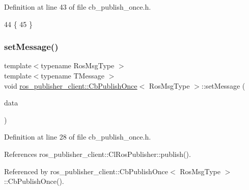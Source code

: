 Definition at line 43 of file cb\+\_\+publish\+\_\+once.\+h.


\begin{DoxyCode}
44     \{
45     \}
\end{DoxyCode}
\mbox{\label{classros__publisher__client_1_1CbPublishOnce_a06bef500e116390ee85a790401e600d8}} 
\subsubsection{\texorpdfstring{set\+Message()}{setMessage()}}
{\footnotesize\ttfamily template$<$typename Ros\+Msg\+Type $>$ \\
template$<$typename T\+Message $>$ \\
void \hyperlink{classros__publisher__client_1_1CbPublishOnce}{ros\+\_\+publisher\+\_\+client\+::\+Cb\+Publish\+Once}$<$ Ros\+Msg\+Type $>$\+::set\+Message (\begin{DoxyParamCaption}\item[{const T\+Message \&}]{data }\end{DoxyParamCaption})\hspace{0.3cm}{\ttfamily [inline]}}



Definition at line 28 of file cb\+\_\+publish\+\_\+once.\+h.



References ros\+\_\+publisher\+\_\+client\+::\+Cl\+Ros\+Publisher\+::publish().



Referenced by ros\+\_\+publisher\+\_\+client\+::\+Cb\+Publish\+Once$<$ Ros\+Msg\+Type $>$\+::\+Cb\+Publish\+Once().


